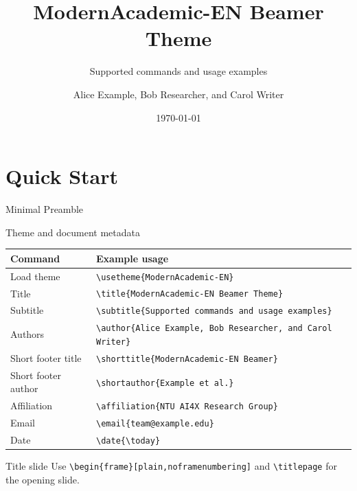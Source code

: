 \documentclass[aspectratio=169,10pt]{beamer}
\title{ModernAcademic-EN Beamer Theme}
\subtitle{Supported commands and usage examples}
\author{Alice Example, Bob Researcher, and Carol Writer}
\affiliation{NTU AI4X Research Group}
\date{\today}
\begin{document}
\begin{frame}
  \titlepage
\end{frame}

\section{Quick Start}

\begin{academicframe}{Minimal Preamble}
  \begin{block}{Theme and document metadata}
    \scriptsize
    \begin{tabular}{ll}
      \toprule
      Command & Example usage \\
      \midrule
      Load theme & \texttt{\textbackslash usetheme\{ModernAcademic-EN\}} \\
      Title & \texttt{\textbackslash title\{ModernAcademic-EN Beamer Theme\}} \\
      Subtitle & \texttt{\textbackslash subtitle\{Supported commands and usage examples\}} \\
      Authors & \texttt{\textbackslash author\{Alice Example, Bob Researcher, and Carol Writer\}} \\
      Short footer title & \texttt{\textbackslash shorttitle\{ModernAcademic-EN Beamer\}} \\
      Short footer author & \texttt{\textbackslash shortauthor\{Example et al.\}} \\
      Affiliation & \texttt{\textbackslash affiliation\{NTU AI4X Research Group\}} \\
      Email & \texttt{\textbackslash email\{team@example.edu\}} \\
      Date & \texttt{\textbackslash date\{\textbackslash today\}} \\
      \bottomrule
    \end{tabular}
  \end{block}

  \vspace{0.45em}
  \begin{exampleblock}{Title slide}
    \scriptsize
    Use \texttt{\textbackslash begin\{frame\}[plain,noframenumbering]} and
    \texttt{\textbackslash titlepage} for the opening slide.
  \end{exampleblock}
\end{academicframe}
\end{document}
